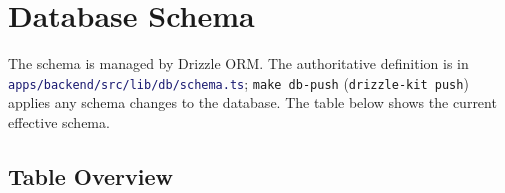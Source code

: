 \documentclass[12pt,a4paper,twoside]{report}
\newcommand{\code}[1]{\texttt{#1}}
\newcommand{\file}[1]{\texttt{\textcolor{MidnightBlue}{#1}}}
\begin{document}
\chapter{Database Schema}
\label{ch:db-schema}

The schema is managed by Drizzle ORM. The authoritative definition is
in \file{apps/backend/src/lib/db/schema.ts}; \code{make db-push}
(\code{drizzle-kit push}) applies any schema changes to the database.
The table below shows the current effective schema.

\section{Table Overview}
\label{sec:schema-overview}
\end{document}
